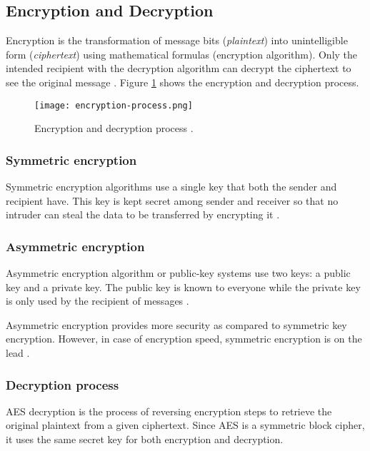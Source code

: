 \subsection{Encryption and Decryption}

Encryption is the transformation of message bits (\textit{plaintext}) into unintelligible form (\textit{ciphertext}) using mathematical formulas (encryption algorithm).
Only the intended recipient with the decryption algorithm can decrypt the ciphertext to see the original message \cite{Devi_2019}.
Figure \ref{fig:encryption-process.png} shows the encryption and decryption process.

\begin{figure}[!ht]
    \centering
    \texttt{[image: encryption-process.png]}
    \caption{Encryption and decryption process \cite{Bhanot_2015}.}
    \label{fig:encryption-process.png}
\end{figure}


\subsubsection{Symmetric encryption}

Symmetric encryption algorithms use a single key that both the sender and recipient have.
This key is kept secret among sender and receiver so that no intruder can steal the data to be transferred by encrypting it  \cite{Bhanot_2015}.


\subsubsection{Asymmetric encryption}

Asymmetric encryption algorithm or public-key systems use two keys: a public key and a private key.
The public key is known to everyone while the private key is only used by the recipient of messages \cite{Bhanot_2015}.

Asymmetric encryption provides more security as compared to symmetric key encryption.
However, in case of encryption speed, symmetric encryption is on the lead \cite{Bhanot_2015}.

\subsubsection{Decryption process}
\label{sec:decryption}

AES decryption is the process of reversing encryption steps to retrieve the original plaintext from a given ciphertext. Since AES is a symmetric block cipher, it uses the same secret key for both encryption and decryption\cite{NIST_AES}.

